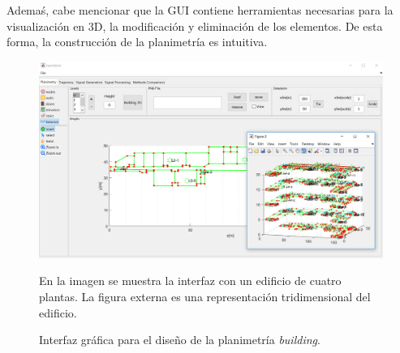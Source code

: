 Ademaś, cabe mencionar que la GUI contiene herramientas necesarias para la visualización en 3D, la modificación y eliminación de los elementos. De esta forma, la construcción de la planimetría es intuitiva.

\begin{figure}
    \centering
    \includegraphics[width=0.8\columnwidth]{img/Design/1.PNG}
    \caption{Interfaz gráfica para el diseño de la planimetría \emph{building}.}
    \footnotesize
    En la imagen se muestra la interfaz con un edificio de cuatro plantas. La figura externa es una representación tridimensional del edificio.
    \label{fig:interfaz1}
\end{figure}









